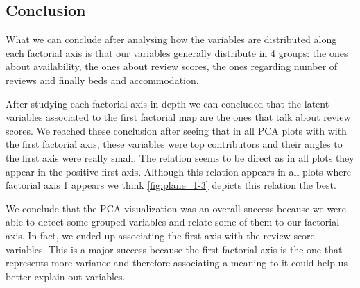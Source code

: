 \begin{landscape}


\subsection{Conclusion}%
What we can conclude after analysing how the variables are distributed along each factorial axis is 
that our variables generally distribute in 4 groups: the ones about availability, 
the ones about review scores, the ones regarding number of reviews and finally beds and accommodation.

After studying each factorial axis in depth we can concluded that the latent variables associated to 
the first factorial map are the ones that talk about review scores. We reached these conclusion after
seeing that in all PCA plots with with the first factorial axis, these variables were top contributors
and their angles to the first axis were really small. The relation seems to be direct as in all plots 
they appear in the positive first axis. Although this relation appears in all plots where factorial
axis 1 appears we think \cref{fig:plane_1-3} depicts this relation the best. 

We conclude that the PCA visualization was an overall success because we were able to detect some grouped
variables and relate some of them to our factorial axis. In fact, we ended up associating the first axis
with the review score variables. This is a major success because the first factorial axis is the one
that represents more variance and therefore associating a meaning to it could help us better explain
out variables.

\end{landscape}







